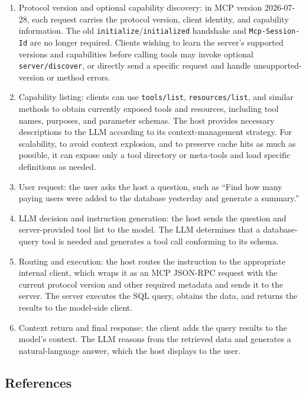 \begin{enumerate}
\def\labelenumi{\arabic{enumi}.}
\item
  Protocol version and optional capability discovery: in MCP version 2026-07-28, each request carries the protocol version, client identity, and capability information. The old \texttt{initialize}/\texttt{initialized} handshake and \texttt{Mcp-Session-Id} are no longer required. Clients wishing to learn the server's supported versions and capabilities before calling tools may invoke optional \texttt{server/discover}, or directly send a specific request and handle unsupported-version or method errors.
\item
  Capability listing: clients can use \texttt{tools/list}, \texttt{resources/list}, and similar methods to obtain currently exposed tools and resources, including tool names, purposes, and parameter schemas. The host provides necessary descriptions to the LLM according to its context-management strategy. For scalability, to avoid context explosion, and to preserve cache hits as much as possible, it can expose only a tool directory or meta-tools and load specific definitions as needed.
\item
  User request: the user asks the host a question, such as ``Find how many paying users were added to the database yesterday and generate a summary.''
\item
  LLM decision and instruction generation: the host sends the question and server-provided tool list to the model. The LLM determines that a database-query tool is needed and generates a tool call conforming to its schema.
\item
  Routing and execution: the host routes the instruction to the appropriate internal client, which wraps it as an MCP JSON-RPC request with the current protocol version and other required metadata and sends it to the server. The server executes the SQL query, obtains the data, and returns the results to the model-side client.
\item
  Context return and final response: the client adds the query results to the model's context. The LLM reasons from the retrieved data and generates a natural-language answer, which the host displays to the user.
\end{enumerate}

\FloatBarrier
{}
\hypertarget{references-123}{%
\subsection{References}\label{references-123}}

